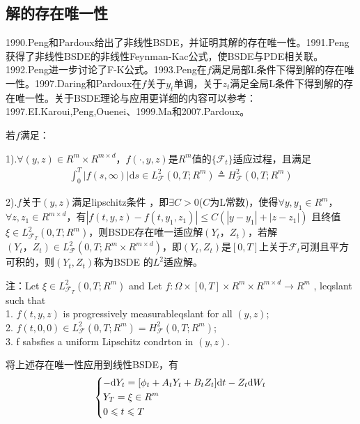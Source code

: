 	\subsection{解的存在唯一性}
		\par
		1990.Peng和Pardoux\cite{1990.Pardoux}给出了非线性BSDE，并证明其解的存在唯一性。1991.Peng\cite{1991.Peng}获得了非线性BSDE的非线性Feynman-Kac公式，使BSDE与PDE相关联。1992.Peng\cite{1992.Peng}进一步讨论了F-K公式。1993.Peng\cite{1993.Peng}在$f$满足局部L条件下得到解的存在唯一性。1997.Daring和Pardoux\cite{1997.Daring}在$f$关于$y_t$单调，关于$z_t$满足全局L条件下得到解的存在唯一性。关于BSDE理论与应用更详细的内容可以参考：1997.EI.Karoui,Peng,Ouenei\cite{1997.EI.Karoui}、1999.Ma\cite{1999.Ma}和2007.Pardoux\cite{2007.Pardoux}。
		\begin{theorem}[BSDE解存在唯一性]
			若$f$满足：\par
			1).$\forall (y,z) \in {R^m} \times {R^{m \times d}}$，$f( \cdot,{y,z} )$是$R^m$值的$\{\mathcal{F}_t\}$适应过程，且满足
			\begin{align*}
			\int_0^T {| {f( {s,\infty })|} \mathrm{d}s \in L_{\mathcal{F}}^2( {0,T;{R^m}} )\triangleq  H_{\mathcal{F}} ^2( {0,T;{R^m}} )}
			\end{align*}
			\par
			2).$f$关于$(y,z)$满足lipschitz条件 ，即$\exists C > 0$($C$为L常数)，使得$\forall y,y_1 \in {R^m}$，$\forall z,z_1 \in {R^{m \times d}}$，有$|{f ( {t,y,z}) - f ( {t,y_1,z_1})} | \leqslant C ( { | {y - {y_1}} | + | {z - {z_1}} |})$
			\noindent 且终值$\xi \in L_{\mathcal{F}_T}^2 ( {0,T;{R^m}} ) $，则BSDE存在唯一适应解$(Y_t，Z_t)$，若解$(Y_t，Z_t)\in L_{\mathcal{F}}^2 ( {0,T;{R^m \times {R^{m \times d}}}} ) $，即$(Y_t,Z_t)$是$[0,T]$上关于${\mathcal {F}}_t$可测且平方可积的，则$(Y_t,Z_t)$称为BSDE 的$L^2$适应解。
		\end{theorem}
			注：Let $\xi \in L_{\mathcal {F}_T}^2( {0,T;{R^m}} )$ and Let $f:\Omega \times [{0,T}] \times {R^m} \times {R^{m \times d}} \to {R^m}$ , leqslant such that\\
			  1. $f(t,y,z)$ is progressively measurableqslant for all $(y,z)$;\\
			  2. $f( {t,0,0}) \in L_{\mathcal {F}}^2( {0,T;{R^m}} ) = H_{\mathcal {F}}^2( {0,T;{R^m}} )$;\\
			  3. f sabsfies a  uniform Lipschitz condrton in $(y,z)$.
		\par
		将上述存在唯一性应用到线性BSDE，有
		\begin{equation*}
			\centering
			\left\{\begin{lgathered}
			{ - \mathrm{d}{Y_t} = [ {{\phi _t} + {A_t}{Y_t} + {B_t}{Z_t}} ]\mathrm{d}t - {Z_t}\mathrm{d}{W_t}}\\
			{{Y_T} = \xi  \in {R^m}}\\
			{0 \leqslant t  \leqslant T}
			\end{lgathered} \right.
		\end{equation*}
